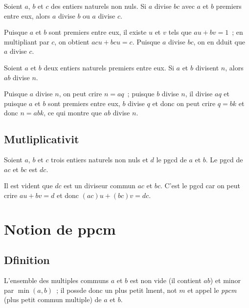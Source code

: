 \documentclass[a4paper,fleqn,openany]{trmbook}
\newcommand*{\definir}[1]{\emph{#1}}
\begin{document}
\begin{lemme}
Soient $a$, $b$ et $c$ des entiers naturels non nuls. Si $a$ divise $bc$ avec $a$ et $b$ premiers entre eux, alors $a$ divise $b$ ou $a$ divise $c$.
\end{lemme}

\begin{demonstration}
Puisque $a$ et $b$ sont premiers entre eux, il existe $u$ et $v$ tels que $au+bv=1$~; en multipliant par $c$, on obtient $acu+bcu=c$. Puisque $a$ divise $bc$, on en dduit que $a$ divise $c$.
\end{demonstration}

\begin{corollaire}
Soient $a$ et $b$ deux entiers naturels premiers entre eux. Si $a$ et $b$ divisent $n$, alors $ab$ divise $n$.
\end{corollaire}

\begin{demonstration}
Puisque $a$ divise $n$, on peut crire $n = aq$~; puisque $b$ divise $n$, il divise $aq$ et puisque $a$ et $b$ sont premiers entre eux, $b$ divise $q$ et donc on peut crire $q = bk$ et donc $n = abk$, ce qui montre que $ab$ divise $n$.
\end{demonstration}

\subsection{Mutliplicativit}

\begin{propriete}
Soient $a$, $b$ et $c$ trois entiers naturels non nuls et $d$ le pgcd de $a$ et $b$. Le pgcd de $ac$ et $bc$ est $dc$.
\end{propriete}

\begin{demonstration}
Il est vident que $dc$ est un diviseur commun  $ac$ et $bc$. C'est le pgcd car on peut crire $au+bv=d$ et donc $(ac)u+(bc)v = dc$.
\end{demonstration}

\section{Notion de ppcm}

\subsection{Dfinition}

L'ensemble des multiples communs  $a$ et $b$ est non vide (il contient $ab$) et minor par $\min(a,b)$~; il possde donc un plus petit lment, not $m$ et appel le \definir{ppcm} (plus petit commun multiple) de $a$ et $b$.
\end{document}
